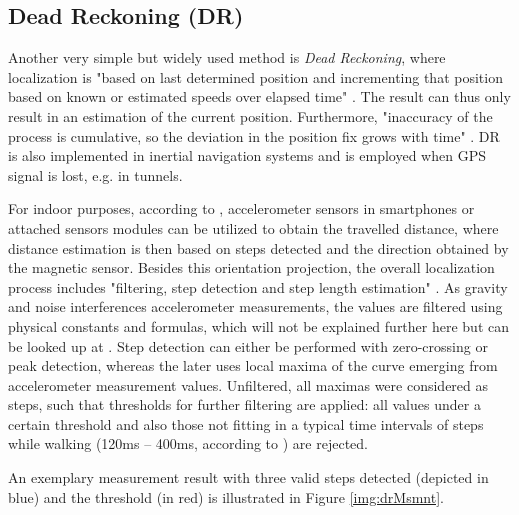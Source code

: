 \subsection*{Dead Reckoning (DR)}

Another very simple but widely used method is \textit{Dead Reckoning}, where localization is "based on last determined	position and incrementing that position based on known or estimated speeds over elapsed time" \cite{recentAdvances}. The result can thus only result in an estimation of the current position. Furthermore, "inaccuracy of the process is cumulative, so the deviation in the position
fix grows with time" \cite{recentAdvances}. DR is also implemented in inertial navigation systems and is employed when GPS signal is lost, e.g. in tunnels.

For indoor purposes, according to \cite{drSystem}, accelerometer sensors in smartphones or attached sensors modules can be utilized to obtain the travelled distance, where distance estimation is then based on steps detected and the direction obtained by the magnetic sensor.
Besides this orientation projection, the overall localization process includes "filtering, step detection and step length estimation" \cite{drSystem}. As gravity and noise interferences accelerometer measurements, the values are filtered using physical constants and formulas, which will not be explained further here but can be looked up at \cite[p.3]{drSystem}.
Step detection can either be performed with zero-crossing or peak detection, whereas the later uses local maxima of the curve emerging from accelerometer measurement values. Unfiltered, all maximas were considered as steps, such that thresholds for further filtering are applied: all values under a certain threshold and also those not fitting in a typical time intervals of steps while walking (120ms – 400ms, according to \cite{drSystem}) are rejected.

An exemplary measurement result with three valid steps detected (depicted in blue) and the threshold (in red) is illustrated in Figure \ref{img:drMsmnt}.

